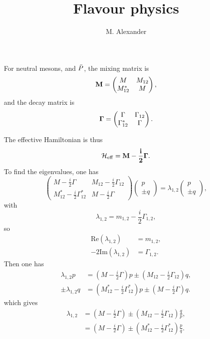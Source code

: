 \documentclass{report}
\title{Flavour physics}
\author{M. Alexander}
\def\PPbar{\ensuremath{\bar{\PP}}\xspace}
\def\ihalf{\ensuremath{\frac{i}{2}}\xspace}
\begin{document}
For neutral mesons, \PP and \PPbar, the mixing matrix is
\begin{equation}
  \bf{M} = \begin{pmatrix}
    M & M_{12} \\
    M_{12}^{*} & M
  \end{pmatrix},
\end{equation}
and the decay matrix is
\begin{equation}
  \bf{\Gamma} = \begin{pmatrix}
    \Gamma & \Gamma_{12} \\
    \Gamma_{12}^{*} & \Gamma
  \end{pmatrix}.
\end{equation}

The effective Hamiltonian is thus
\begin{equation}
  \bf{\mathcal{H}_\mathrm{eff}} = \bf{M} - \frac{i}{2} \bf{\Gamma}.
\end{equation}
To find the eigenvalues, one has
\begin{equation}
  \begin{pmatrix} M - \frac{i}{2} \Gamma & M_{12} - \frac{i}{2} \Gamma_{12} \\
    M_{12}^* - \frac{i}{2} \Gamma_{12}^* & M - \frac{i}{2} \Gamma
  \end{pmatrix}
  \begin{pmatrix} p \\ \pm q \end{pmatrix}
  = \lambda_{1,2} \begin{pmatrix} p \\ \pm q \end{pmatrix},
\end{equation}
with
\begin{equation}
  \lambda_{1,2} = m_{1,2} - \ihalf \Gamma_{1,2},
\end{equation}
so
\begin{align}
  \mathrm{Re}(\lambda_{1,2}) &= m_{1,2}, \\
  -2 \mathrm{Im}(\lambda_{1,2}) &= \Gamma_{1,2}.
\end{align}
Then one has
\begin{align}
  \lambda_{1,2} p &= \left(M - \ihalf \Gamma\right) p \pm \left(M_{12} - \ihalf \Gamma_{12}\right) q,\\
  \pm \lambda_{1,2} q &= \left(M_{12}^* - \ihalf \Gamma_{12}^*\right) p \pm \left(M - \ihalf \Gamma\right) q.
\end{align}
which gives
\begin{align}
  \lambda_{1,2} &= \left(M - \ihalf \Gamma\right) \pm \left(M_{12} - \ihalf \Gamma_{12}\right) \frac{q}{p}, \\
  & = \left(M - \ihalf \Gamma\right) \pm \left(M_{12}^* - \ihalf \Gamma_{12}^*\right) \frac{p}{q}.
\end{align}
\end{document}
